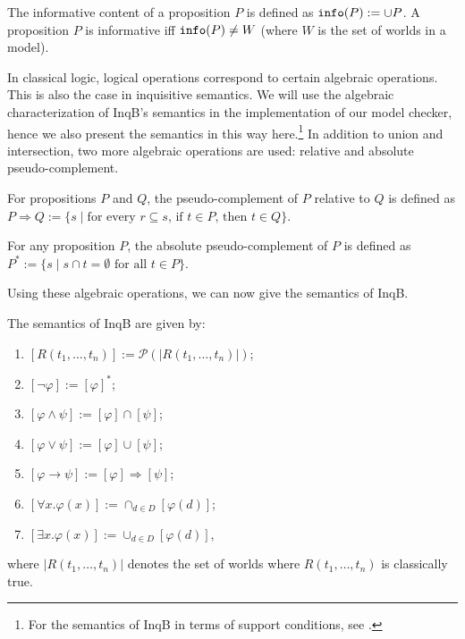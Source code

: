 \begin{defi}\label{definfo}
 The informative content of a proposition $P$ is defined as $\texttt{info}(P):=\cup P$. A proposition $P$ is informative iff $\texttt{info}(P)\neq W$ (where $W$ is the set of worlds in a model).
\end{defi}

In classical logic, logical operations correspond to certain algebraic operations. This is also the case in inquisitive semantics. We will use the algebraic characterization of \textsf{InqB}'s semantics in the implementation of our model checker, hence we also present the semantics in this way here.\footnote{For the semantics of \textsf{InqB} in terms of support conditions, see \cite[p.\ 62-63]{inquisitive19}.} In addition to union and intersection, two more algebraic operations are used: relative and absolute pseudo-complement.

\begin{defi}\label{defpseudo}
 For propositions $P$ and $Q$, the pseudo-complement of $P$ relative to $Q$ is defined as $P\Rightarrow Q:= \{s \mid \text{for every } r\subseteq s\text{, if } t\in P\text{, then } t\in Q\}$. 

 For any proposition $P$, the absolute pseudo-complement of $P$ is defined as $P^*:=\{s\mid s\cap t=\emptyset \text{ for all } t\in P\}$.
\end{defi}
Using these algebraic operations, we can now give the semantics of \textsf{InqB}.

\begin{defi}\label{defsemantics}
 The semantics of \textsf{InqB} are given by:
 \begin{enumerate}\setlength\itemsep{-0.3em}
     \item $[R(t_1,\dots,t_n)] := \mathcal{P}(|R(t_1,\dots,t_n)|)$;
     \item $[\neg \varphi]:=[\varphi]^*$;
     \item $[\varphi\land\psi]:=[\varphi]\cap [\psi]$;
     \item $[\varphi\lor\psi]:=[\varphi]\cup [\psi]$;
     \item $[\varphi\rightarrow\psi]:=[\varphi]\Rightarrow [\psi]$;
     \item $[\forall x . \varphi(x)]:= \cap_{d\in D} [\varphi(d)]$;
     \item $[\exists x . \varphi(x)]:= \cup_{d\in D} [\varphi(d)]$,
 \end{enumerate}
 where $|R(t_1,\dots,t_n)|$ denotes the set of worlds where $R(t_1,\dots,t_n)$ is classically true.
\end{defi}

